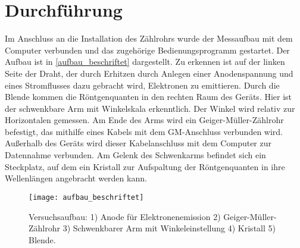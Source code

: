 \section{Durchführung}




Im Anschluss an die Installation des Zählrohrs wurde der Messaufbau mit dem Computer verbunden und das zugehörige Bedienungsprogramm gestartet. Der Aufbau ist in \autoref{aufbau_beschriftet} dargestellt. Zu erkennen ist auf der linken Seite der Draht, der durch Erhitzen durch Anlegen einer Anodenspannung und eines Stromflusses dazu gebracht wird, Elektronen zu emittieren. Durch die Blende kommen die Röntgenquanten in den rechten Raum des Geräts. Hier ist der schwenkbare Arm mit Winkelskala erkenntlich. Der Winkel wird relativ zur Horizontalen gemessen. Am Ende des Arms wird ein Geiger-Müller-Zählrohr befestigt, das mithilfe eines Kabels mit dem GM-Anschluss verbunden wird. Außerhalb des Geräts wird dieser Kabelanschluss mit dem Computer zur Datennahme verbunden. Am Gelenk des Schwenkarms befindet sich ein Steckplatz, auf dem ein Kristall zur Aufspaltung der Röntgenquanten in ihre Wellenlängen angebracht werden kann. 
\begin{figure}[H]
	\centering
	\texttt{[image: aufbau\_beschriftet]}
	\caption{Versuchsaufbau: 1) Anode für Elektronenemission 2) Geiger-Müller-Zählrohr 3) Schwenkbarer Arm mit Winkeleinstellung 4) Kristall 5) Blende.}
	\label{aufbau_beschriftet}
\end{figure}




